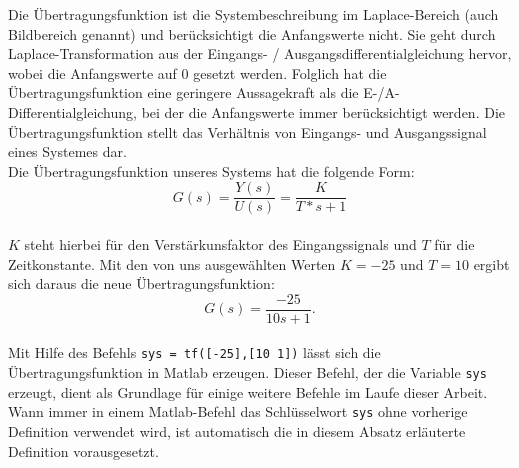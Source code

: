 Die Übertragungsfunktion ist die Systembeschreibung im Laplace-Bereich (auch Bildbereich genannt) und berücksichtigt die Anfangswerte nicht. Sie geht durch Laplace-Transformation aus der Eingangs- / Ausgangsdifferentialgleichung hervor, wobei die Anfangswerte auf 0 gesetzt werden. Folglich hat die Übertragungsfunktion eine geringere Aussagekraft als die E-/A-Differentialgleichung, bei der die Anfangswerte immer berücksichtigt werden. Die Übertragungsfunktion stellt das Verhältnis von Eingangs- und Ausgangssignal eines Systemes dar.\\
Die Übertragungsfunktion unseres Systems hat die folgende Form:
\begin{equation*}
    G(s)=\frac{Y(s)}{U(s)}=\frac{K}{T*s+1}
\end{equation*}\\
$K$ steht hierbei für den Verstärkunsfaktor des Eingangssignals und $T$ für die Zeitkonstante.
Mit den von uns ausgewählten Werten $K=-25$ und $T=10$ ergibt sich daraus die neue Übertragungsfunktion:
\begin{equation*}
    G(s)=\frac{-25}{10s+1} .
\end{equation*}\\
Mit Hilfe des Befehls \texttt{sys = tf([-25],[10 1])} lässt sich die Übertragungsfunktion in Matlab erzeugen. Dieser Befehl, der die Variable \texttt{sys} erzeugt, dient als Grundlage für einige weitere Befehle im Laufe dieser Arbeit. Wann immer in einem Matlab-Befehl das Schlüsselwort \texttt{sys} ohne vorherige Definition verwendet wird, ist automatisch die in diesem Absatz erläuterte Definition vorausgesetzt.